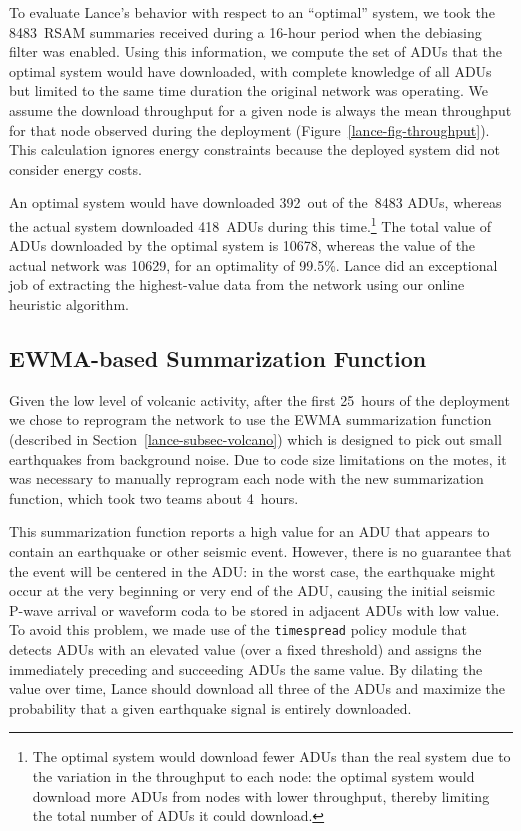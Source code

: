 To evaluate Lance's behavior with respect to an ``optimal'' system, we took
the 8483~RSAM summaries received during a 16-hour period when the debiasing
filter was enabled. Using this information, we compute the set of ADUs that
the optimal system would have downloaded, with complete knowledge of all ADUs
but limited to the same time duration the original network was operating. We
assume the download throughput for a given node is always the mean throughput
for that node observed during the deployment
(Figure~\ref{lance-fig-throughput}). This calculation ignores energy
constraints because the deployed system did not consider energy costs.

An optimal system would have downloaded 392~out of the~8483 ADUs, whereas the
actual system downloaded 418~ADUs during this time.\footnote{The optimal
system would download fewer ADUs than the real system due to the variation in
the throughput to each node: the optimal system would download more ADUs from
nodes with lower throughput, thereby limiting the total number of ADUs it
could download.} The total value of ADUs downloaded by the optimal system is
10678, whereas the value of the actual network was 10629, for an optimality
of 99.5\%. Lance did an exceptional job of extracting the highest-value data
from the network using our online heuristic algorithm.

\subsection{EWMA-based Summarization Function}
\label{lance-sec-ewma-deployment}

Given the low level of volcanic activity, after the first 25~hours of the
deployment we chose to reprogram the network to use the EWMA summarization
function (described in Section~\ref{lance-subsec-volcano}) which is designed
to pick out small earthquakes from background noise. Due to code size
limitations on the motes, it was necessary to manually reprogram each node
with the new summarization function, which took two teams about 4~hours.

This summarization function reports a high value for an ADU that appears to
contain an earthquake or other seismic event. However, there is no guarantee
that the event will be centered in the ADU: in the worst case, the earthquake
might occur at the very beginning or very end of the ADU, causing the initial
seismic P-wave arrival or waveform coda to be stored in adjacent ADUs with
low value. To avoid this problem, we made use of the \texttt{timespread}
policy module that detects ADUs with an elevated value (over a fixed
threshold) and assigns the immediately preceding and succeeding ADUs the same
value. By dilating the value over time, Lance should download all three of
the ADUs and maximize the probability that a given earthquake signal is
entirely downloaded.

